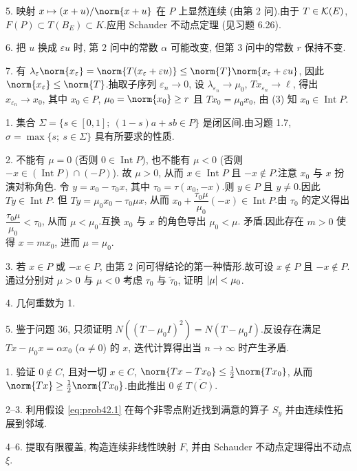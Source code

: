 5. 映射 $x\mapsto(x+u)/\norm{x+u}$ 在 $P$ 上显然连续 (由第 2 问).由于 $T\in\mathcal{K}(E)$,
$F(P)\subset T(B_E)\subset K$.应用 Schauder 不动点定理 (见习题 6.26).

6. 把 $u$ 换成 $\varepsilon u$ 时, 第 2 问中的常数 $\alpha$ 可能改变, 但第 3 问中的常数 $r$ 保持不变.

7. 有 $\lambda_\varepsilon\norm{x_\varepsilon}=\norm{T(x_\varepsilon+\varepsilon u)}\le\norm{T}\norm{x_\varepsilon+\varepsilon u}$,
因此 $\norm{x_\varepsilon}\le\norm{T}$.抽取子序列 $\varepsilon_n\to0$, 设 $\lambda_{\varepsilon_n}\to\mu_0$,
$Tx_{\varepsilon_n}\to\ell$, 得出 $x_{\varepsilon_n}\to x_0$, 其中 $x_0\in P$,
$\mu_0=\norm{x_0}\ge r$ 且 $Tx_0=\mu_0x_0$, 由 (3) 知 $x_0\in\operatorname{Int}P$.


1. 集合 $\Sigma=\{s\in[0,1];\ (1-s)a+sb\in P\}$ 是闭区间.由习题 1.7, $\sigma=\max\{s;\ s\in\Sigma\}$
具有所要求的性质.

2. 不能有 $\mu=0$ (否则 $0\in\operatorname{Int}P$), 也不能有 $\mu<0$ (否则 $-x\in(\operatorname{Int}P)\cap(-P)$).
故 $\mu>0$, 从而 $x\in\operatorname{Int}P$ 且 $-x\notin P$.注意 $x_0$ 与 $x$ 扮演对称角色.
令 $y=x_0-\tau_0x$, 其中 $\tau_0=\tau(x_0,-x)$.则 $y\in P$ 且 $y\ne0$.因此 $Ty\in\operatorname{Int}P$.
但 $Ty=\mu_0x_0-\tau_0\mu x$, 从而 $x_0+\dfrac{\tau_0\mu}{\mu_0}(-x)\in\operatorname{Int}P$.由 $\tau_0$
的定义得出 $\dfrac{\tau_0\mu}{\mu_0}<\tau_0$, 从而 $\mu<\mu_0$.互换 $x_0$ 与 $x$ 的角色导出 $\mu_0<\mu$.
矛盾.因此存在 $m>0$ 使得 $x=mx_0$, 进而 $\mu=\mu_0$.

3. 若 $x\in P$ 或 $-x\in P$, 由第 2 问可得结论的第一种情形.故可设 $x\notin P$ 且 $-x\notin P$.
通过分别对 $\mu>0$ 与 $\mu<0$ 考虑 $\tau_0$ 与 $\tilde\tau_0$, 证明 $\left|\mu\right|<\mu_0$.

4. 几何重数为 1.

5. 鉴于问题 36, 只须证明 $N((T-\mu_0I)^2)=N(T-\mu_0I)$.反设存在满足 $Tx-\mu_0x=\alpha x_0$
($\alpha\ne0$) 的 $x$, 迭代计算得出当 $n\to\infty$ 时产生矛盾.



1. 验证 $0\notin C$, 且对一切 $x\in C$, $\norm{Tx-Tx_0}\le\frac12\norm{Tx_0}$, 从而
$\norm{Tx}\ge\frac12\norm{Tx_0}$.由此推出 $0\notin\overline{T(C)}$.

2--3. 利用假设 \eqref{eq:prob42.1} 在每个非零点附近找到满意的算子 $S_y$ 并由连续性拓展到邻域.

4--6. 提取有限覆盖, 构造连续非线性映射 $F$, 并由 Schauder 不动点定理得出不动点 $\xi$.

